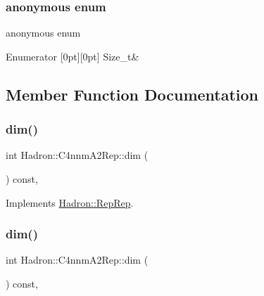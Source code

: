 \subsubsection{\texorpdfstring{anonymous enum}{anonymous enum}}
{\footnotesize\ttfamily anonymous enum}

\begin{DoxyEnumFields}{Enumerator}
[0pt][0pt]{}\mbox{\label{structHadron_1_1C4nnmA2Rep_a55cb6d85934bb51e5c681c421ed0efa4a89faaf903e6320156ee81d95c0439854}} 
Size\+\_\+t&\\
\hline

\end{DoxyEnumFields}


\subsection{Member Function Documentation}
\mbox{\label{structHadron_1_1C4nnmA2Rep_a02dd57918f08f3c16982ad3f17b8fe8f}} 
\subsubsection{\texorpdfstring{dim()}{dim()}\hspace{0.1cm}{\footnotesize\ttfamily [1/5]}}
{\footnotesize\ttfamily int Hadron\+::\+C4nnm\+A2\+Rep\+::dim (\begin{DoxyParamCaption}{ }\end{DoxyParamCaption}) const\hspace{0.3cm}{\ttfamily [inline]}, {\ttfamily [virtual]}}



Implements \mbox{\hyperlink{structHadron_1_1RepRep_a92c8802e5ed7afd7da43ccfd5b7cd92b}{Hadron\+::\+Rep\+Rep}}.

\mbox{\label{structHadron_1_1C4nnmA2Rep_a02dd57918f08f3c16982ad3f17b8fe8f}} 
\subsubsection{\texorpdfstring{dim()}{dim()}\hspace{0.1cm}{\footnotesize\ttfamily [2/5]}}
{\footnotesize\ttfamily int Hadron\+::\+C4nnm\+A2\+Rep\+::dim (\begin{DoxyParamCaption}{ }\end{DoxyParamCaption}) const\hspace{0.3cm}{\ttfamily [inline]}, {\ttfamily [virtual]}}



